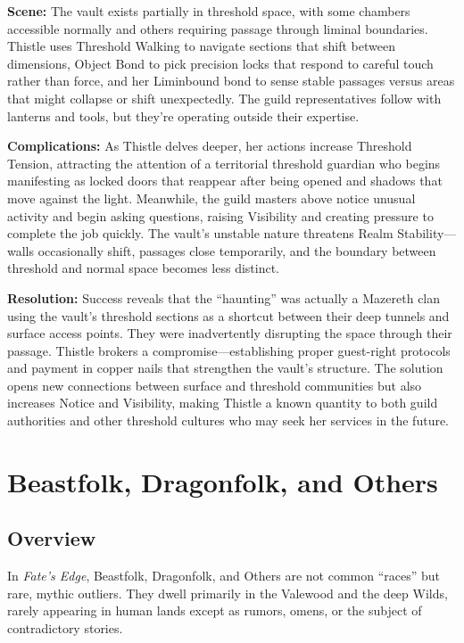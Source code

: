 \documentclass[11pt]{book}
\begin{document}
\textbf{Scene:} The vault exists partially in threshold space, with some chambers accessible normally and others requiring passage through liminal boundaries. Thistle uses Threshold Walking to navigate sections that shift between dimensions, Object Bond to pick precision locks that respond to careful touch rather than force, and her Liminbound bond to sense stable passages versus areas that might collapse or shift unexpectedly. The guild representatives follow with lanterns and tools, but they're operating outside their expertise.

\textbf{Complications:} As Thistle delves deeper, her actions increase Threshold Tension, attracting the attention of a territorial threshold guardian who begins manifesting as locked doors that reappear after being opened and shadows that move against the light. Meanwhile, the guild masters above notice unusual activity and begin asking questions, raising Visibility and creating pressure to complete the job quickly. The vault's unstable nature threatens Realm Stability---walls occasionally shift, passages close temporarily, and the boundary between threshold and normal space becomes less distinct.

\textbf{Resolution:} Success reveals that the ``haunting'' was actually a Mazereth clan using the vault's threshold sections as a shortcut between their deep tunnels and surface access points. They were inadvertently disrupting the space through their passage. Thistle brokers a compromise---establishing proper guest-right protocols and payment in copper nails that strengthen the vault's structure. The solution opens new connections between surface and threshold communities but also increases Notice and Visibility, making Thistle a known quantity to both guild authorities and other threshold cultures who may seek her services in the future.

\clearpage
\chapter{Beastfolk, Dragonfolk, and Others}
\section{Overview}
\label{sec:nonhuman_overview}

In \emph{Fate's Edge}, Beastfolk, Dragonfolk, and Others are not common ``races'' but rare, mythic outliers. They dwell primarily in the Valewood and the deep Wilds, rarely appearing in human lands except as rumors, omens, or the subject of contradictory stories.
\end{document}
